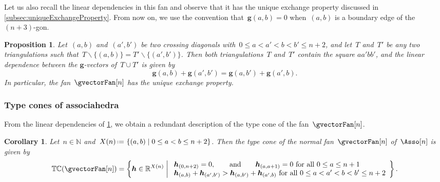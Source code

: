 \documentclass{amsart}
\newtheorem{corollary}[theorem]{Corollary}
\newtheorem{proposition}[theorem]{Proposition}
\theoremstyle{definition}
\newcommand{\R}{\mathbb{R}} %
\newcommand{\N}{\mathbb{N}} %
\renewcommand{\b}[1]{{\boldsymbol{#1}}} %
\newcommand{\set}[2]{\left\{ #1 \;\middle|\; #2 \right\}} %
\newcommand{\ssm}{\smallsetminus} %
\newcommand{\eqdef}{\mbox{\,\raisebox{0.2ex}{\scriptsize\ensuremath{\mathrm:}}\ensuremath{=}\,}} %
\newcommand{\gvector}[1]{\b{g}(#1)} %
\newcommand{\typeCone}{\mathbb{TC}} %
\begin{document}
Let us also recall the linear dependencies in this fan and observe that it has the unique exchange property discussed in \cref{subsec:uniqueExchangeProperty}.
From now on, we use the convention that~$\gvector{a,b} = 0$ when~$(a,b)$ is a boundary edge of the $(n+3)$-gon.

\begin{proposition}
\label{prop:exchangeablePairsAsso}
Let~$(a,b)$ and~$(a',b')$ be two crossing diagonals with~${0 \le a < a' < b < b' \le n+2}$, and let~$T$ and~$T'$ be any two triangulations such that~$T \ssm \{(a,b)\} = T' \ssm \{(a',b')\}$.
Then both triangulations~$T$ and~$T'$ contain the square $aa'bb'$, and the linear dependence between the $\b{g}$-vectors of~$T \cup T'$ is given by
\[
\gvector{a,b} + \gvector{a',b'} = \gvector{a,b'} + \gvector{a',b}.
\]
In particular, the fan~$\gvectorFan[n]$ has the unique exchange property.
\end{proposition}

\subsubsection{Type cones of associahedra}

From the linear dependencies of \cref{prop:exchangeablePairsAsso}, we obtain a redundant description of the type cone of the fan~$\gvectorFan[n]$.

\begin{corollary}
\label{coro:typeConeAsso}
Let~$n \in \N$ and~$X(n) \eqdef \set{(a,b)}{0 \le a < b \le n+2}$. Then the type cone of the normal fan~$\gvectorFan[n]$ of~$\Asso[n]$ is given by
\[
\typeCone(\gvectorFan[n]) = \set{\b{h} \in \R^{X(n)}}{\begin{array}{l} \b{h}_{(0,n+2)} = 0, \qquad\text{and}\qquad \b{h}_{(a,a+1)} = 0 \text{ for all } 0 \le a \le n+1 \\ \b{h}_{(a,b)} + \b{h}_{(a',b')} > \b{h}_{(a,b')} + \b{h}_{(a',b)} \text{ for all } 0 \le a < a' < b < b' \le n+2 \end{array}}.
\]
\end{corollary}
\end{document}
